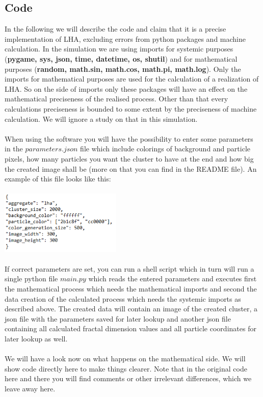 \documentclass[12pt,a4paper]{scrartcl}
\numberwithin{equation}{subsection}
\newcommand{\1}{\mathbbm{1}}
\numberwithin{equation}{section}
\theoremstyle{definition}
\begin{document}
\subsection{Code}
In the following we will describe the code and claim that it is a precise implementation of LHA, excluding errors from python packages and machine calculation. In the simulation we are using imports for systemic purposes (\textbf{pygame, sys, json, time, datetime, os, shutil}) and for mathematical purposes (\textbf{random, math.sin, math.cos, math.pi, math.log}). Only the imports for mathematical purposes are used for the calculation of a realization of LHA. So on the side of imports only these packages will have an effect on the mathematical preciseness of the realised process. Other than that every calculations preciseness is bounded to some extent by the preciseness of machine calculation. We will ignore a study on that in this simulation. \\
\\When using the software you will have the possibility to enter some parameters in the $\mathit{parameters.json}$ file which include colorings of background and particle pixels, how many particles you want the cluster to have at the end and how big the created image shall be (more on that you can find in the README file). An example of this file looks like this:\\
\\
\includegraphics[height=3cm]{images/code-snippets/parameters.png} \\
\\
If correct parameters are set, you can run a shell script which in turn will run a single python file $\mathit{main.py}$ which reads the entered parameters and executes first the mathematical process which needs the mathematical imports and second the data creation of the calculated process which needs the systemic imports as described above. The created data will contain an image of the created cluster, a json file with the parameters saved for later lookup and another json file containing all calculated fractal dimension values and all particle coordinates for later lookup as well. \\
\\We will have a look now on what happens on the mathematical side. We will show code directly here to make things clearer. Note that in the original code here and there you will find comments or other irrelevant differences, which we leave away here. \\
\end{document}

